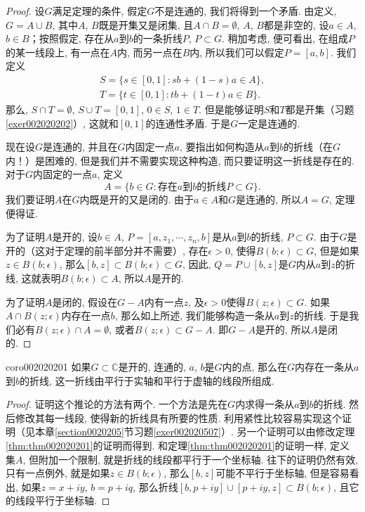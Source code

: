 \begin{proof}
设$G$满足定理的条件, 假定$G$不是连通的, 我们将得到一个矛盾. 由定义, $G = A \cup B$, 其中$A$, $B$既是开集又是闭集, 且$A \cap B = \emptyset$, $A$, $B$都是非空的, 设$a \in A$, $b \in B$；按照假定, 存在从$a$到$b$的一条折线$P$, $P \subset G$. 稍加考虑, 便可看出, 在组成$P$的某一线段上,  有一点在$A$内, 而另一点在$B$内, 所以我们可以假定$P=[a, b]$. 我们定义
\begin{gather*}
S = \{s \in [0, 1] : sb + (1-s)a \in A\},\\
T = \{t \in [0, 1] : tb + (1-t)a \in B\}.
\end{gather*}
那么, $S \cap T = \emptyset$, $S \cup T = [0,1]$, $0 \in S$, $1 \in T$. 但是能够证明$S$和$T$都是开集（习题\ref{exer002020202}）, 这就和$[0,1]$的连通性矛盾. 于是$G$一定是连通的. 

现在设$G$是连通的, 并且在$G$内固定一点$a$, 要指出如何构造从$a$到$b$的折线（在$G$内！）是困难的, 但是我们并不需要实现这种构造, 而只要证明这一折线是存在的. 对于$G$内固定的一点$a$, 定义
\[
A = \{ b \in G: \text{存在}a\text{到}b\text{的折线}P \subset G\}.
\]
我们要证明$A$在$G$内既是开的又是闭的. 由于$a \in A$和$G$是连通的, 所以$A = G$, 定理便得证. 

为了证明$A$是开的, 设$b \in A$, $P = [a, z_1, \cdots, z_n, b]$是从$a$到$b$的折线, $P \subset G$. 由于$G$是开的（这对于定理的前半部分并不需要）, 存在$\epsilon > 0$, 使得$B(b; \epsilon) \subset G$, 但是如果$z \in B(b; \epsilon)$, 那么$[b, z] \subset B(b;\epsilon) \subset G$, 因此, $Q = P \cup [b,z]$是$G$内从$a$到$z$的折线, 这就表明$B(b; \epsilon) \subset A$, 所以$A$是开的. 

为了证明$A$是闭的, 假设在$G-A$内有一点$z$, 及$\epsilon > 0$使得$B(z; \epsilon) \subset G$. 如果$A \cap B(z; \epsilon)$内存在一点$b$, 那么如上所述, 我们能够构造一条从$a$到$z$的折线. 于是我们必有$B(z;\epsilon) \cap A = \emptyset$, 或者$B(z;\epsilon) \subset G-A$. 即$G-A$是开的, 所以$A$是闭的. 
\end{proof}

\begin{corollary}{}{coro002020201}
如果$G\subset{}\mathbb{C}$是开的, 连通的, $a$, $b$是$G$内的点, 那么在$G$内存在一条从$a$到$b$的折线, 这一折线由平行于实轴和平行于虚轴的线段所组成. 
\end{corollary}

\begin{proof}
证明这个推论的方法有两个. 一个方法是先在$G$内求得一条从$a$到$b$的折线. 然后修改其每一线段, 使得新的折线具有所要的性质. 利用紧性比较容易实现这个证明（见本章\ref{section0020205}节习题\ref{exer002020507}）. 另一个证明可以由修改定理\ref{thm:thm002020201}的证明而得到. 和定理\ref{thm:thm002020201}的证明一样, 定义集$A$, 但附加一个限制, 就是折线的线段都平行于一个坐标轴. 往下的证明仍然有效, 只有一点例外, 就是如果$z \in B(b; \epsilon)$, 那么$[b,z]$可能不平行于坐标轴, 但是容易看出, 如果$z=x+iy$, $b=p+iq$, 那么折线$[b,p+iy]\cup [p+iy, z] \subset B(b;\epsilon)$, 且它的线段平行于坐标轴. 
\end{proof}

